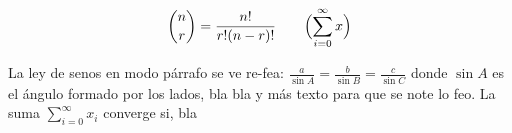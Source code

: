 \begin{equation*}
\binom{n}{r} = \frac{n!}{r!(n-r)!}\qquad
\Bigl(\sum_{i=0}^{\infty} x \Bigr)
\end{equation*}

La ley de senos en modo párrafo se ve re-fea: $\displaystyle{\frac{a}{\sin A} =\frac{b}{\sin B} = \frac{c}{\sin C}}$ donde $\sin A$ es el ángulo formado por los lados, bla bla y más texto para que se note lo feo. La suma $\sum_{i=0}^{\infty} x_i$ converge si, bla
\endinput